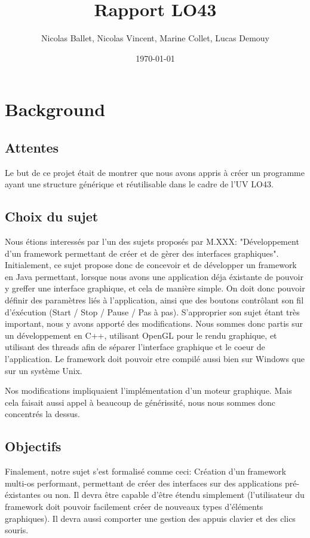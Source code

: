 \documentclass[a4paper]{report}
\title{Rapport LO43}
\author{Nicolas Ballet, Nicolas Vincent, Marine Collet, Lucas Demouy}
\date{\today}
\begin{document}
\maketitle

\tableofcontents
\listoffigures

\chapter{Background}

\section{Attentes}

Le but de ce projet était de montrer que nous avons appris à créer un programme ayant une structure générique et
réutilisable dans le cadre de l'UV LO43.

\section{Choix du sujet}

Nous étions interessés par l'un des sujets proposés par M.XXX: "Développement d'un framework permettant de créer et de
gèrer des interfaces graphiques". Initialement, ce sujet propose donc de concevoir et de développer un framework en
Java permettant, lorsque nous avons une application déja éxistante de pouvoir y greffer une interface graphique, et cela
de manière simple. On doit donc pouvoir définir des paramètres liés à l'application, ainsi que des boutons contrôlant
son fil d'éxécution (Start / Stop / Pause / Pas à pas).
S'approprier son sujet étant très important, nous y avons apporté des
modifications. Nous sommes donc partis sur un développement en C++, utilisant OpenGL pour le rendu graphique, et
utilisant des threads afin de séparer l'interface graphique et le coeur de l'application. Le
framework doit pouvoir etre compilé aussi bien sur Windows que sur un système Unix.

Nos modifications impliquaient l'implémentation d'un moteur graphique. Mais cela faisait aussi appel à beaucoup de
générissité, nous nous sommes donc concentrés la dessus.

\section{Objectifs}

Finalement, notre sujet s'est formalisé comme ceci:
Création d'un framework multi-os performant, permettant de créer des interfaces sur des applications pré-éxistantes ou
non. Il devra être capable d'être étendu simplement (l'utilisateur du framework doit pouvoir facilement créer de
nouveaux types d'éléments graphiques). Il devra aussi comporter une gestion des appuis clavier et des clics souris.
\end{document}
